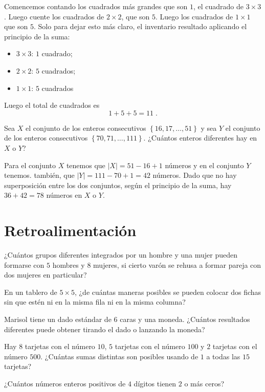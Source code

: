 \documentclass[12pt]{article}
\begin{document}
\begin{solucion}
Comencemos contando los cuadrados más grandes que son $1$, el cuadrado de $3\times 3$. Luego cuente los cuadrados de $2\times 2$, que son $5$. Luego los cuadrados de $1\times 1$ que son $5$. Solo para dejar esto más claro, el inventario resultado aplicando el principio de la suma:
\begin{itemize}
    \item $3\times 3$: $1$ cuadrado;
    \item $2\times 2$: $5$ cuadrados;
    \item $1\times 1$: $5$ cuadrados
\end{itemize}
Luego el total de cuadrados es
\[1+5+5=11\;.\]
\end{solucion}

\begin{ejemplo}
Sea $X$ el conjunto de los enteros consecutivos $\left\{16,17,\ldots,51\right\}$ y sea $Y$ el conjunto de los enteros consecutivos $\left\{70,71,\ldots,111\right\}$. ¿Cuántos enteros diferentes hay en $X$ o $Y$?
\end{ejemplo}
\begin{solucion}
Para el conjunto $X$ tenemos que $|X|=51-16+1$ números y en el conjunto $Y$ tenemos. también, que $|Y|=111-70+1=42$ números. Dado que no hay superposición entre los dos conjuntos, según el principio de la suma, hay $36 + 42 = 78$ números en $X$ o $Y$.
\end{solucion}

\section{Retroalimentación}
\begin{problema}
¿Cuántos grupos diferentes integrados por un hombre y una mujer pueden formarse con $5$ hombres y $8$ mujeres, si cierto varón se rehusa a formar pareja con dos mujeres en particular?    
\end{problema}

\begin{problema}
En un tablero de $5\times 5$, ¿de cuántas maneras posibles se pueden colocar dos fichas sin que estén ni en la misma fila ni en la misma columna?
\end{problema}

\begin{problema}
Marisol tiene un dado estándar de $6$ caras y una moneda.  ¿Cuántos resultados diferentes puede obtener tirando el dado o lanzando la moneda?
\end{problema}

\begin{problema}
    Hay $8$ tarjetas con el número $10$, $5$ tarjetas con el número $100$ y $2$ tarjetas con el número $500$. ¿Cuántas sumas distintas son posibles usando de $1$ a todas las $15$ tarjetas?
\end{problema}

\begin{problema}
    ¿Cuántos números enteros positivos de $4$ dígitos tienen $2$ o más ceros?
\end{problema}
\end{document}
